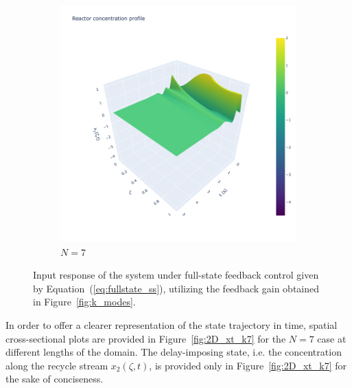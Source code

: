 \begin{figure}[!htbp]
\begin{subfigure}[b]{0.45\textwidth}
        \includegraphics[width=\textwidth,trim=0 0 100 0,clip]{Figures/3D_x1_k7.png}
        \caption{$N=7$}
        \label{fig:3D_x1_k7}
    \end{subfigure}
    \caption{Input response of the system under full-state feedback control given by Equation~(\ref{eq:fullstate_ss}), utilizing the feedback gain obtained in Figure~\ref{fig:k_modes}.}
    \label{fig:full_state_feedback}
\end{figure}

In order to offer a clearer representation of the state trajectory in time, spatial cross-sectional plots are provided in Figure~\ref{fig:2D_xt_k7} for the $N=7$ case at different lengths of the domain. The delay-imposing state, i.e. the concentration along the recycle stream $x_2(\zeta,t)$, is provided only in Figure~\ref{fig:2D_xt_k7} for the sake of conciseness.

